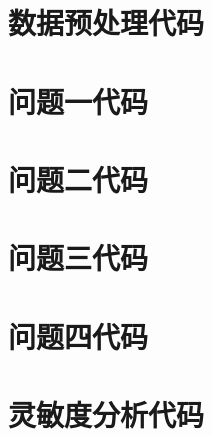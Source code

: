 \documentclass{ctexart}
\begin{document}
\section{数据预处理代码}


\section{问题一代码}





\section{问题二代码}


\section{问题三代码}


\section{问题四代码}



\section{灵敏度分析代码}




\end{document}
